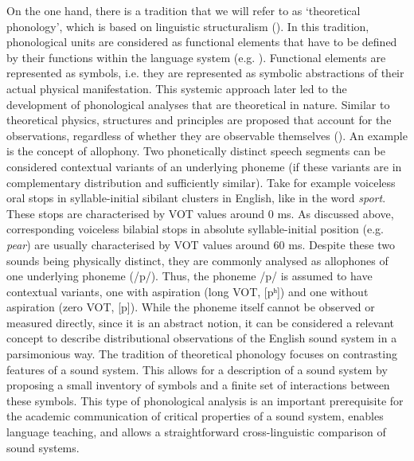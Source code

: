 On the one hand, there is a tradition that we will refer to as ‘theoretical phonology’, which is based on linguistic structuralism (\citealt{Sapir1925,Bloomfield1933,Trubeckoj1939,Saussure1989}). In this tradition, phonological units are considered as functional elements that have to be defined by their functions within the language system (e.g. \citealt{Trubeckoj1939}). Functional elements are represented as symbols, i.e. they are represented as symbolic abstractions of their actual physical manifestation. This systemic approach later led to the development of phonological analyses that are theoretical in nature. Similar to theoretical physics, structures and principles are proposed that account for the observations, regardless of whether they are observable themselves (\citealt{Gussenhoven2015}). An example is the concept of allophony. Two phonetically distinct speech segments can be considered contextual variants of an underlying phoneme (if these variants are in complementary distribution and sufficiently similar). Take for example voiceless oral stops in syllable-initial sibilant clusters in English, like in the word \textit{sport}. These stops are characterised by VOT values around 0 ms. As discussed above, corresponding voiceless bilabial stops in absolute syllable-initial position (e.g. \textit{pear}) are usually characterised by VOT values around 60 ms. Despite these two sounds being physically distinct, they are commonly analysed as allophones of one underlying phoneme (/p/). Thus, the phoneme /p/ is assumed to have contextual variants, one with aspiration (long VOT, [pʰ]) and one without aspiration (zero VOT, [p]). While the phoneme itself cannot be observed or measured directly, since it is an abstract notion, it can be considered a relevant concept to describe distributional observations of the English sound system in a parsimonious way. The tradition of theoretical phonology focuses on contrasting features of a sound system. This allows for a description of a sound system by proposing a small inventory of symbols and a finite set of interactions between these symbols. This type of phonological analysis is an important prerequisite for the academic communication of critical properties of a sound system, enables language teaching, and allows a straightforward cross-linguistic comparison of sound systems. 

